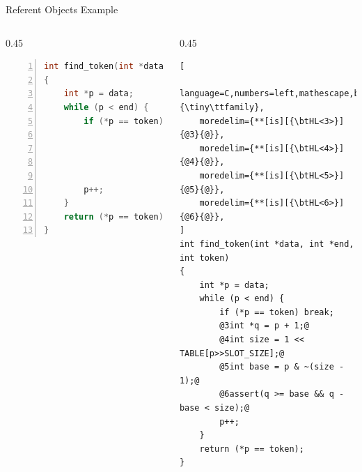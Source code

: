 \documentclass[aspectratio=169]{beamer}
\begin{document}
\begin{frame}[fragile]{Referent Objects Example}
\footnotesize
\begin{columns}[T]
\begin{column}{0.45\textwidth}
\begin{lstlisting}[language=C,numbers=left,mathescape,basicstyle={\tiny\ttfamily}]
int find_token(int *data, int *end, int token)
{
    int *p = data;
    while (p < end) {
        if (*p == token) break;




        p++;
    }
    return (*p == token);
}
\end{lstlisting}
\end{column}

\pause

\begin{column}{0.45\textwidth}
\begin{lstlisting}[
    language=C,numbers=left,mathescape,basicstyle={\tiny\ttfamily},
    moredelim={**[is][{\btHL<3>}]{@3}{@}},
    moredelim={**[is][{\btHL<4>}]{@4}{@}},
    moredelim={**[is][{\btHL<5>}]{@5}{@}},
    moredelim={**[is][{\btHL<6>}]{@6}{@}},
]
int find_token(int *data, int *end, int token)
{
    int *p = data;
    while (p < end) {
        if (*p == token) break;
        @3int *q = p + 1;@
        @4int size = 1 << TABLE[p>>SLOT_SIZE];@
        @5int base = p & ~(size - 1);@
        @6assert(q >= base && q - base < size);@
        p++;
    }
    return (*p == token);
}
\end{lstlisting}
\end{column}

\end{columns}
\end{frame}




\end{document}

